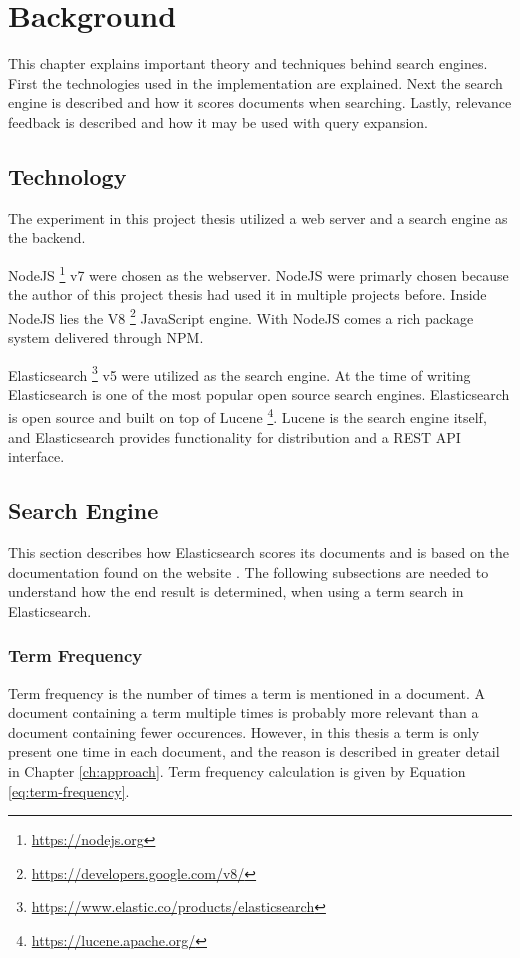 \chapter{Background}
\label{ch:background}
This chapter explains important theory and techniques behind search engines.
First the technologies used in the implementation are explained.
Next the search engine is described and how it scores documents when searching.
Lastly, relevance feedback is described and how it may be used with query expansion.

\section{Technology}
The experiment in this project thesis utilized a web server and a search engine as the backend.

NodeJS \footnote{\url{https://nodejs.org}} v7 were chosen as the webserver.
NodeJS were primarly chosen because the author of this project thesis had used it in multiple projects before.
Inside NodeJS lies the V8 \footnote{\url{https://developers.google.com/v8/}} JavaScript engine.
With NodeJS comes a rich package system delivered through NPM.

Elasticsearch \footnote{\url{https://www.elastic.co/products/elasticsearch}} v5 were utilized as the search engine.
At the time of writing Elasticsearch is one of the most popular open source search engines.
Elasticsearch is open source and built on top of Lucene \footnote{\url{https://lucene.apache.org/}}.
Lucene is the search engine itself,
and Elasticsearch provides functionality for distribution and a REST API interface.

\section{Search Engine}
This section describes how Elasticsearch scores its documents and is based on the documentation found on the website \cite{elasticsearch-scoring}.
The following subsections are needed to understand how the end result is determined, when using a term search in Elasticsearch.

\subsection{Term Frequency}
Term frequency is the number of times a term is mentioned in a document.
A document containing a term multiple times is probably more relevant than a document containing fewer occurences.
However, in this thesis a term is only present one time in each document, and the reason is described in greater detail in Chapter \ref{ch:approach}.
Term frequency calculation is given by Equation \ref{eq:term-frequency}.

